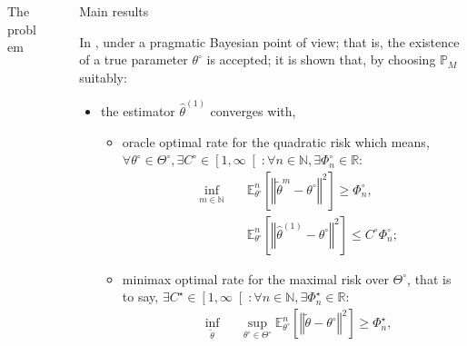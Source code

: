 \documentclass[final,hyperref={pdfpagelabels=false}]{beamer}
\begin{document}
\begin{frame}[t]
\begin{columns}[t]
\begin{column}{.30\textwidth}
\begin{block}{\rule{0pt}{2.5ex} The problem}
\end{block}

\end{column} %

\begin{column}{.02\textwidth}\end{column} %

\begin{column}{.30\textwidth} %


\begin{block}{\rule{0pt}{2.5ex} Main results}
In \citet{JJASRS}, under a \textcolor{red!90!black}{pragmatic Bayesian} point of view; that is, the existence of a true parameter $\theta^{\circ}$ is accepted; it is shown that, by choosing $\mathbb{P}_{M}$ suitably:
\begin{itemize}
	\item the estimator $\widehat{\theta}^{\left(1\right)}$ \textcolor{red!90!black}{converges with,}
	\begin{itemize}
		\item \textcolor{red!90!black}{oracle optimal rate} for the quadratic risk which means, $\forall \theta^{\circ} \in \Theta^{\circ}, \exists C^{\circ} \in \left[ 1, \infty \right[ : \forall n \in \mathbb{N}, \exists \Phi_{n}^{\circ} \in \mathbb{R}:$
		\begin{alignat*}{2}
&\inf\limits_{m \in \mathbb{N}} \, && \mathbb{E}_{\theta^{\circ}}^{n}\left[\left\Vert \tilde{\theta}^{m} - \theta^{\circ} \right\Vert^{2}\right] \geq \Phi_{n}^{\circ},\\
& && \mathbb{E}_{\theta^{\circ}}^{n}\left[\left\Vert \widehat{\theta}^{\left(1\right)} - \theta^{\circ} \right\Vert^{2}\right] \leq C^{\circ} \Phi_{n}^{\circ};
		\end{alignat*}
		\item \textcolor{red!90!black}{minimax optimal rate} for the maximal risk over $\Theta^{\circ}$, that is to say, $\exists C^{\star} \in \left[ 1, \infty \right[ : \forall n \in \mathbb{N}, \exists \Phi_{n}^{\star} \in \mathbb{R}:$
\begin{alignat*}{2}
& \inf\limits_{\tilde{\theta}} &&\sup\limits_{\theta^{\circ} \in \Theta^{\circ}} \mathbb{E}_{\theta^{\circ}}^{n}\left[\left\Vert \tilde{\theta} - \theta^{\circ} \right\Vert^{2}\right] \geq \Phi_{n}^{\star},\\

\end{alignat*}
\end{itemize}
\end{itemize}
\end{block}
\end{column}
\end{columns}
\end{frame}
\end{document}
